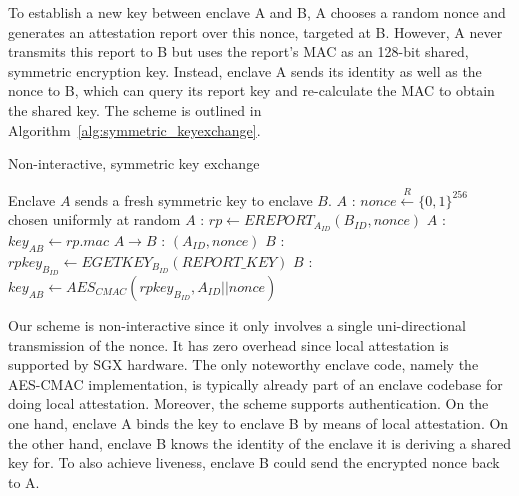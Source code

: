 \documentclass{sig-alternate-05-2015}
\begin{document}
To establish a new key between enclave A and B, A chooses a random nonce and generates an attestation report over this nonce, targeted at B. 
However, A never transmits this report to B but uses the report's MAC as an 128-bit shared, symmetric encryption key. 
Instead, enclave A sends its identity as well as the nonce to B, which can query its report key and re-calculate the MAC to obtain the shared key. 
The scheme is outlined in Algorithm~\ref{alg:symmetric_keyexchange}. 

\begin{algorithm}[H]
\caption{Non-interactive, symmetric key exchange}
\begin{algorithmic}
\STATE Enclave $A$ sends a fresh symmetric key to enclave $B$.
\STATE $A$ : $nonce \overset{R}{\leftarrow} \{0,1\}^{256}$ chosen uniformly at random
\STATE $A$ : $rp \leftarrow EREPORT_{A_{ID}}(B_{ID}, nonce)$
\STATE $A$ : $key_{AB} \leftarrow rp.mac$
\STATE $A\rightarrow{B}$ : $(A_{ID}, nonce)$
\STATE $B$ : $rpkey_{B_{ID}} \leftarrow EGETKEY_{B_{ID}}(REPORT\_KEY)$
\STATE $B$ : $key_{AB} \leftarrow AES_{CMAC}(rpkey_{B_{ID}}, A_{ID} || nonce)$
\end{algorithmic}
\label{alg:symmetric_keyexchange}
\end{algorithm}

Our scheme is non-interactive since it only involves a single uni-directional transmission of the nonce. 
It has zero overhead since local attestation is supported by SGX hardware. 
The only noteworthy enclave code, namely the AES-CMAC implementation, is typically already part of an enclave codebase for doing local attestation. 
Moreover, the scheme supports authentication. 
On the one hand, enclave A binds the key to enclave B by means of local attestation. 
On the other hand, enclave B knows the identity of the enclave it is deriving a shared key for. 
To also achieve liveness, enclave B could send the encrypted nonce back to A.

\balancecolumns %
\end{document}
